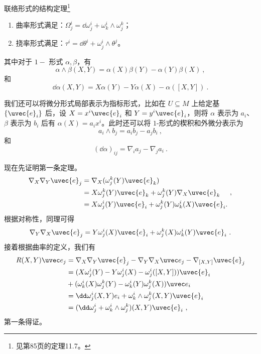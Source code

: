 \begin{theorem}{联络形式的结构定理\footnote{见\cite{GTM275}第85页的定理11.7。}}\label{the_ConFom_2}
\begin{enumerate}
\item 曲率形式满足：$\Omega^i_j=\dd \omega^i_j+\omega^i_k\wedge\omega^k_j$；
\item 挠率形式满足：$\tau^i=\dd\theta^i+\omega^i_j\wedge\theta^j$。
\end{enumerate}

其中对于 $1-$ 形式 $\alpha, \beta$，有
\begin{equation}
\alpha\wedge \beta(X, Y)=\alpha(X)\beta(Y)-\alpha(Y)\beta(X)~,
\end{equation}
和
\begin{equation}
\dd \alpha(X, Y)=X\alpha(Y)-Y\alpha(X)-\alpha([X, Y])~.
\end{equation}

我们还可以将微分形式局部表示为指标形式，比如在 $U\subseteq M$ 上给定基 $\{\uvec{e}_i\}$ 后，设 $X=x^i\uvec{e}_i$ 和 $Y=y^i\uvec{e}_i$，则将 $\alpha$ 表示为 $a_i$、$\beta$ 表示为 $b_i$ 后有 $\alpha(X)=a_ix^i$。此时还可以将 $1$-形式的楔积和外微分表示为
\begin{equation}
a_i\wedge b_j=a_ib_j-a_jb_i~,
\end{equation}
和
\begin{equation}
(\dd \alpha)_{ij}=\nabla_{i}a_j-\nabla_{j}a_i~.
\end{equation}
\end{theorem}


现在先证明第一条定理。
\begin{equation}
\begin{aligned}
\nabla_X\nabla_Y\uvec{e}_j& =\nabla_X(\omega_j^k(Y)\uvec{e}_k) \\
&=X\omega_j^k(Y)\uvec{e}_k+\omega_j^k(Y)\nabla_X\uvec{e}_k \\
&=X\omega_j^i(Y)\uvec{e}_i+\omega_j^k(Y)\omega_k^i(X)\uvec{e}_i.
\end{aligned}~,
\end{equation}
根据对称性，同理可得
\begin{equation}
\nabla_Y\nabla_X\uvec{e}_j =Y\omega_j^i(X)\uvec{e}_i+\omega_j^k(X)\omega_k^i(Y)\uvec{e}_i~.
\end{equation}
接着根据曲率的定义，我们有
\begin{equation}
\begin{aligned}
R(X,Y)\uvec e_j& =\nabla_X\nabla_Y\uvec{e}_j-\nabla_Y\nabla_X\uvec e_j-\nabla_{[X,Y]}\uvec{e}_j \\
&=(X\omega_j^i(Y)-Y\omega_j^i(X)-\omega_j^i([X,Y]))\uvec{e}_i \\
&+(\omega_k^i(X)\omega_j^k(Y)-\omega_k^i(Y)\omega_j^k(X))\uvec e_i \\
&=\dd\omega_j^i(X,Y)e_i+\omega_k^i\wedge\omega_j^k(X,Y)\uvec{e}_i \\
&=(\dd\omega_j^i+\omega_k^i\wedge\omega_j^k)(X,Y)\uvec{e}_i~,
\end{aligned}
\end{equation}
第一条得证。

